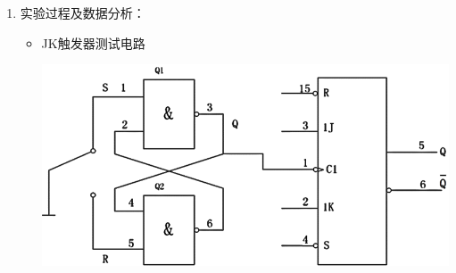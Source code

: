 \documentclass[UTF8]{ctexart}
\begin{document}
\begin{enumerate}
      \item  实验过程及数据分析：  \\
            \begin{itemize}
                  \item JK触发器测试电路  
                        \begin{center}
                              \includegraphics[scale = 0.6]{6.png}
                        \end{center}


\end{itemize}
\end{enumerate}
\end{document}
